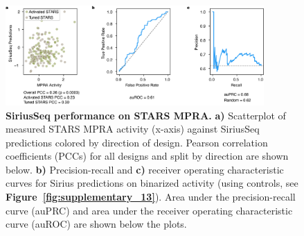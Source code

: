 \begin{figure}[p]
    \centering
    \includegraphics[width=0.88\textwidth]{2_figures-and-files/SuppFig14.png}
    \caption[SiriusSeq performance on STARS MPRA.]{\textbf{SiriusSeq performance on STARS MPRA.} \textbf{a)} Scatterplot of measured STARS MPRA activity (x-axis) against SiriusSeq predictions colored by direction of design. Pearson correlation coefficients (PCCs) for all designs and split by direction are shown below. \textbf{b)} Precision-recall and \textbf{c)} receiver operating characteristic curves for Sirius predictions on binarized activity (using controls, see \textbf{Figure~\ref{fig:supplementary_13}}). Area under the precision-recall curve (auPRC) and area under the receiver operating characteristic curve (auROC) are shown below the plots.}
    \label{fig:supplementary_14}
\end{figure}

